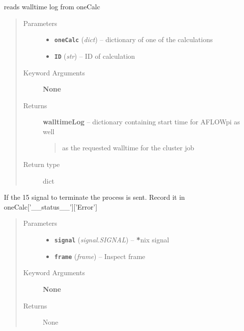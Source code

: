 \documentclass[letterpaper,10pt,english]{sphinxmanual}
\begin{document}
\begin{fulllineitems}
\label{run:run.__readWalltimeLog}
reads walltime log from oneCalc
\begin{quote}\begin{description}
\item[{Parameters}] \leavevmode\begin{itemize}
\item {} 
\textbf{\texttt{oneCalc}} (\emph{dict}) -- dictionary of one of the calculations

\item {} 
\textbf{\texttt{ID}} (\emph{str}) -- ID of calculation

\end{itemize}

\item[{Keyword Arguments}] \leavevmode
\textbf{None}

\item[{Returns}] \leavevmode

\textbf{walltimeLog} --
dictionary containing start time for AFLOWpi as well
\begin{quote}

as the requested walltime for the cluster job
\end{quote}


\item[{Return type}] \leavevmode
dict

\end{description}\end{quote}

\end{fulllineitems}


\begin{fulllineitems}
\label{run:run.__recordDeath}
If the 15 signal to terminate the process is sent.
Record it in oneCalc{[}'\_\_status\_\_'{]}{[}'Error'{]}
\begin{quote}\begin{description}
\item[{Parameters}] \leavevmode\begin{itemize}
\item {} 
\textbf{\texttt{signal}} (\emph{signal.SIGNAL}) -- {\color{red}\bfseries{}*}nix signal

\item {} 
\textbf{\texttt{frame}} (\emph{frame}) -- Inspect frame

\end{itemize}

\item[{Keyword Arguments}] \leavevmode
\textbf{None}

\item[{Returns}] \leavevmode
None

\end{description}\end{quote}

\end{fulllineitems}
\end{document}
